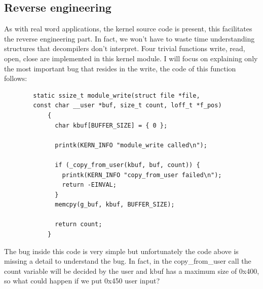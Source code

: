     \subsection{Reverse engineering}
    As with real word applications, the kernel source code is present, this facilitates the reverse engineering part.\newline
    In fact, we won't have to waste time understanding structures that decompilers don't interpret.\newline
    Four trivial functions write, read, open, close are implemented in this kernel module.\newline
    I will focus on explaining only the most important bug that resides in the write, the code of this function follows:\newline
    \clearpage
    \begin{verbatim}
        static ssize_t module_write(struct file *file,
        const char __user *buf, size_t count, loff_t *f_pos)
            {
              char kbuf[BUFFER_SIZE] = { 0 };
            
              printk(KERN_INFO "module_write called\n");
            
              if (_copy_from_user(kbuf, buf, count)) {
                printk(KERN_INFO "copy_from_user failed\n");
                return -EINVAL;
              }
              memcpy(g_buf, kbuf, BUFFER_SIZE);
            
              return count;
            }
    \end{verbatim}
    The bug inside this code is very simple but unfortunately the code above is missing a detail to understand the bug.\newline
    In fact, in the copy\_from\_user call the count variable will be decided by the user and kbuf has a maximum size of 0x400, so what could happen if we put 0x450 user input?\newline
    \clearpage
